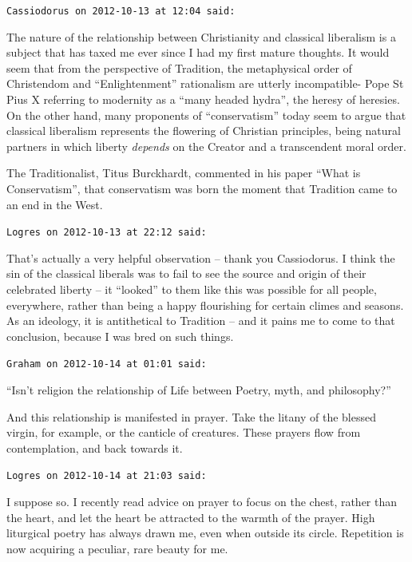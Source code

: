 \begin{footnotesize}
\begin{sffamily}
\texttt{Cassiodorus on 2012-10-13 at 12:04 said:}

The nature of the relationship between Christianity and classical liberalism is a subject that has taxed me ever since I had my first mature thoughts. It would seem that from the perspective of Tradition, the metaphysical order of Christendom and ``Enlightenment'' rationalism are utterly incompatible- Pope St Pius X referring to modernity as a ``many headed hydra'', the heresy of heresies. On the other hand, many proponents of ``conservatism'' today seem to argue that classical liberalism represents the flowering of Christian principles, being natural partners in which liberty \emph{depends} on the Creator and a transcendent moral order.

The Traditionalist, Titus Burckhardt, commented in his paper ``What is Conservatism'', that conservatism was born the moment that Tradition came to an end in the West.

\hfill

\texttt{Logres on 2012-10-13 at 22:12 said:}

That's actually a very helpful observation -- thank you Cassiodorus. I think the sin of the classical liberals was to fail to see the source and origin of their celebrated liberty -- it ``looked'' to them like this was possible for all people, everywhere, rather than being a happy flourishing for certain climes and seasons. As an ideology, it is antithetical to Tradition -- and it pains me to come to that conclusion, because I was bred on such things.

\hfill

\texttt{Graham on 2012-10-14 at 01:01 said:}

``Isn't religion the relationship of Life between Poetry, myth, and philosophy?''

And this relationship is manifested in prayer. Take the litany of the blessed virgin, for example, or the canticle of creatures. These prayers flow from contemplation, and back towards it.

\hfill

\texttt{Logres on 2012-10-14 at 21:03 said:}

I suppose so. I recently read advice on prayer to focus on the chest, rather than the heart, and let the heart be attracted to the warmth of the prayer. High liturgical poetry has always drawn me, even when outside its circle. Repetition is now acquiring a peculiar, rare beauty for me.


\end{sffamily}
\end{footnotesize}

